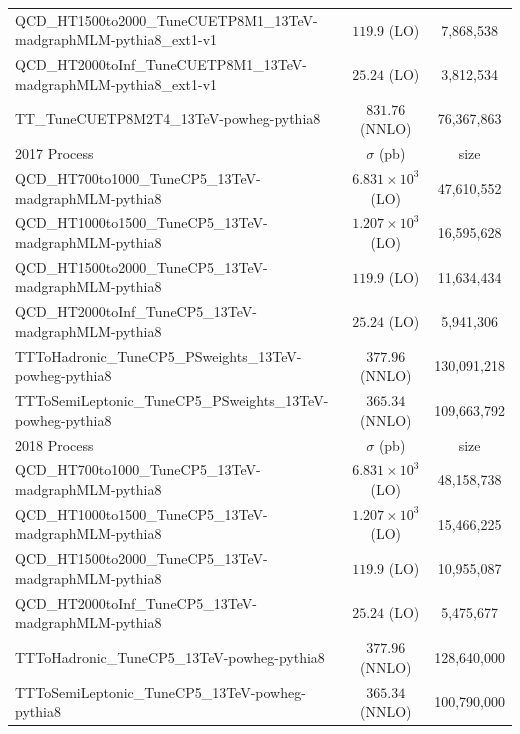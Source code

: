 \begin{table}[htb]
\begin{center}
\begin{tabular}{l|c|c}
      {QCD\_HT1500to2000\_TuneCUETP8M1\_13TeV-madgraphMLM-pythia8\_ext1-v1} & $119.9 $            (LO) & 7,868,538   \\
      {QCD\_HT2000toInf\_TuneCUETP8M1\_13TeV-madgraphMLM-pythia8\_ext1-v1}  & $25.24 $            (LO) & 3,812,534  \\
      \hline
      {TT\_TuneCUETP8M2T4\_13TeV-powheg-pythia8} & $831.76$ (NNLO) & 76,367,863 \\
      \hline
      \hline

      2017 Process & $\sigma$ (pb) & size \\
      \hline

      {QCD\_HT700to1000\_TuneCP5\_13TeV-madgraphMLM-pythia8}  & $6.831\times 10^3$  (LO) & 47,610,552 \\
      {QCD\_HT1000to1500\_TuneCP5\_13TeV-madgraphMLM-pythia8} & $1.207\times 10^3$  (LO) & 16,595,628  \\
      {QCD\_HT1500to2000\_TuneCP5\_13TeV-madgraphMLM-pythia8} & $119.9 $            (LO) & 11,634,434  \\
      {QCD\_HT2000toInf\_TuneCP5\_13TeV-madgraphMLM-pythia8}  & $25.24 $            (LO) & 5,941,306  \\
      \hline
      {TTToHadronic\_TuneCP5\_PSweights\_13TeV-powheg-pythia8} & $377.96$ (NNLO) & 130,091,218 \\
      {TTToSemiLeptonic\_TuneCP5\_PSweights\_13TeV-powheg-pythia8} & $365.34$ (NNLO) & 109,663,792 \\
      \hline
      \hline

      2018 Process & $\sigma$ (pb) & size \\
      \hline

      {QCD\_HT700to1000\_TuneCP5\_13TeV-madgraphMLM-pythia8}  & $6.831\times 10^3$  (LO) & 48,158,738 \\
      {QCD\_HT1000to1500\_TuneCP5\_13TeV-madgraphMLM-pythia8} & $1.207\times 10^3$  (LO) & 15,466,225  \\
      {QCD\_HT1500to2000\_TuneCP5\_13TeV-madgraphMLM-pythia8} & $119.9 $            (LO) & 10,955,087  \\
      {QCD\_HT2000toInf\_TuneCP5\_13TeV-madgraphMLM-pythia8}  & $25.24 $            (LO) & 5,475,677  \\
      \hline
      {TTToHadronic\_TuneCP5\_13TeV-powheg-pythia8} & $377.96$ (NNLO) & 128,640,000 \\
      {TTToSemiLeptonic\_TuneCP5\_13TeV-powheg-pythia8} & $365.34$ (NNLO) & 100,790,000 \\
      \hline
      \hline
    \end{tabular}
    \label{tab:bkg_MC}
  \end{center}
\end{table}

